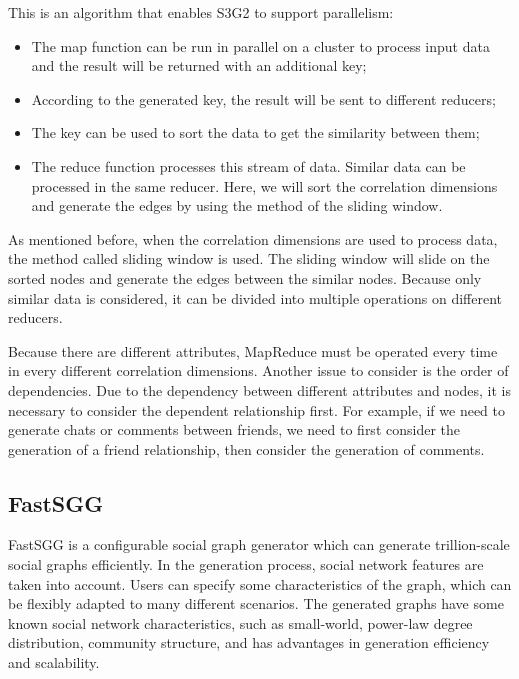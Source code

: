 \begin{survey}
This is an algorithm that enables S3G2 to support parallelism:

\begin{itemize}
\item
  The map function can be run in parallel on a cluster to process input
  data and the result will be returned with an additional key;
\item
  According to the generated key, the result will be sent to different
  reducers;
\item
  The key can be used to sort the data to get the similarity between
  them;
\item
  The reduce function processes this stream of data. Similar data can be
  processed in the same reducer. Here, we will sort the correlation
  dimensions and generate the edges by using the method of the sliding
  window.
\end{itemize}

\vspace{0.2cm}

As mentioned before, when the correlation dimensions are used to process
data, the method called sliding window is used. The sliding window will
slide on the sorted nodes and generate the edges between the similar
nodes. Because only similar data is considered, it can be divided into
multiple operations on different reducers.

Because there are different attributes, MapReduce must be operated every
time in every different correlation dimensions. Another issue to
consider is the order of dependencies. Due to the dependency between
different attributes and nodes, it is necessary to consider the
dependent relationship first. For example, if we need to generate chats
or comments between friends, we need to first consider the generation of
a friend relationship, then consider the generation of comments.

\subsection{FastSGG\cite{FastSGG}}

FastSGG is a configurable social graph generator which can generate
trillion-scale social graphs efficiently. In the generation process,
social network features are taken into account. Users can specify some
characteristics of the graph, which can be flexibly adapted to many
different scenarios. The generated graphs have some known social network
characteristics, such as small-world, power-law degree distribution,
community structure, and has advantages in generation efficiency and
scalability.


\end{survey}
